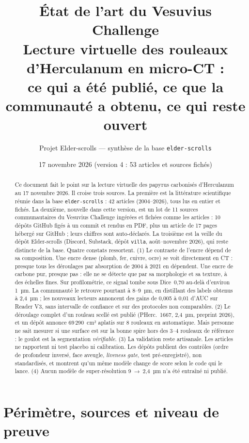 \documentclass[11pt,a4paper]{article}
\title{État de l'art du Vesuvius Challenge\\[4pt]
\large Lecture virtuelle des rouleaux d'Herculanum en micro-CT :\\ ce qui a été publié, ce que la communauté a obtenu, ce qui reste ouvert}
\author{Projet Elder-scrolls — synthèse de la base \texttt{elder-scrolls}}
\date{17 novembre 2026 (version 4 : 53 articles et sources fichés)}
\newcommand{\pherc}[1]{PHerc.~#1}
\begin{document}
\maketitle

\begin{abstract}
\noindent Ce document fait le point sur la lecture virtuelle des papyrus carbonisés d'Herculanum
au 17 novembre 2026. Il croise trois sources. La première est la littérature scientifique
réunie dans la base \texttt{elder-scrolls} : 42 articles (2004–2026), tous lus en entier et
fichés. La deuxième, nouvelle dans cette version, est un lot de 11 sources communautaires
du Vesuvius Challenge ingérées et fichées comme les articles : 10 dépôts GitHub figés à un
commit et rendus en PDF, plus un article de 17 pages hébergé sur GitHub ; leurs chiffres sont
auto-déclarés. La troisième est la veille du dépôt Elder-scrolls (Discord, Substack, dépôt
\texttt{villa}, août–novembre 2026), qui reste distincte de la base. Quatre constats ressortent.
(1) Le contraste de l'encre dépend de sa composition. Une encre dense (plomb, fer, cuivre,
ocre) se voit directement en CT : presque tous les déroulages par absorption de 2004 à 2021
en dépendent. Une encre
de carbone pur, presque pas : elle ne se détecte que par sa morphologie et sa texture, à des
échelles fines. Sur profilométrie, ce signal tombe sous Dice~0,70 au-delà d'environ 1~µm. La
communauté le retrouve pourtant à 8–9~µm, en distillant des labels obtenus à 2,4~µm ; les
nouveaux lecteurs annoncent des gains de 0,005 à 0,01 d'AUC sur Reader V3, sans intervalle de
confiance et sur des protocoles non comparables.
(2) Le déroulage complet d'un rouleau scellé est publié (\pherc{1667}, 2,4~µm, preprint 2026),
et un dépôt annonce 69\,290~cm² aplatis sur 8 rouleaux en automatique. Mais personne ne sait
mesurer si une surface est sur la bonne spire hors des 3–4 rouleaux de référence : le goulot
est la segmentation \emph{vérifiable}.
(3) La validation reste artisanale. Les articles ne rapportent ni test placebo ni
calibration. Les dépôts publient des contrôles (ordre de profondeur inversé, face aveugle,
\emph{liveness gate}, test pré-enregistré), non standardisés, et montrent qu'un même modèle
change de score selon le code qui le lance.
(4) Aucun modèle de super-résolution 9~→~2,4~µm n'a été entraîné ni publié.
\end{abstract}

\tableofcontents

\section{Périmètre, sources et niveau de preuve}
\end{document}

